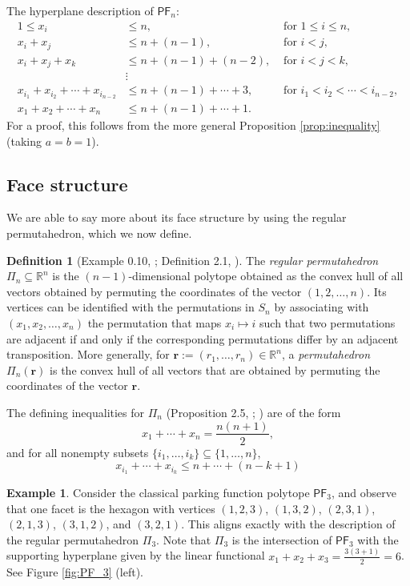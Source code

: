 \documentclass[11pt]{amsart}
\theoremstyle{definition}
\newtheorem{definition}[theorem]{Definition}
\newtheorem{example}[theorem]{Example}
\newcommand{\0}{\emptyset}
\newcommand{\R}{\mathbb{R}}
\newcommand{\PF}{\mathsf{PF}}
\begin{document}
The hyperplane description of $\PF_n$: 
\begin{align*}
    1 \leq x_i &\leq n, &\text{ for } 1 \leq i \leq n,\\
    x_i+x_j &\leq n + (n-1), &\text{ for } i < j,\\
    x_i+x_j+x_k &\leq n + (n-1) + (n-2), &\text{ for } i < j < k,\\
    &\vdots\nonumber\\
    x_{i_1}+ x_{i_2}+ \cdots + x_{i_{n-2}} &\leq n + (n-1) + \cdots + 3, &\text{ for } i_1 < i_2 < \cdots < i_{n-2},\\
    x_{1}+ x_{2}+ \cdots + x_{n} &\leq n + (n-1) + \cdots + 1.
\end{align*}
For a proof, this follows from the more general Proposition \ref{prop:inequality} (taking $a=b=1$).


\subsection{Face structure}
We are able to say more about its face structure by using the regular permutahedron, which we now define.

\begin{definition}[Example 0.10, \cite{Ziegler}; Definition 2.1, \cite{Pos}]\label{def:permutahedron}
The \textit{regular permutahedron} $\Pi_{n} \subseteq \R^n$ is the $(n-1)$-dimensional polytope obtained as the convex hull of all vectors obtained by permuting the coordinates of the vector $(1,2,\ldots,n)$. 
Its vertices can be identified with the permutations in $S_n$ by associating with $(x_1, x_2, \ldots, x_n)$ the permutation that maps $x_i \mapsto i$ such that two permutations are adjacent if and only if the corresponding permutations differ by an adjacent transposition.
More generally, for $\mathbf{r}:=(r_1, \ldots, r_n) \in \R^n$, a \textit{permutahedron} $\Pi_n(\mathbf{r})$ is the convex hull of all vectors that are obtained by permuting the coordinates of the vector $\mathbf{r}$.

The defining inequalities for $\Pi_n$ (Proposition 2.5, \cite{Pos}; \cite{Rad}) are of the form \[x_1 +\cdots +x_n = \frac{n(n+1)}{2},\] and for all nonempty subsets $\{i_1, \ldots, i_k\} \subseteq \{1, \ldots, n\}$, \[x_{i_1} + \cdots +x_{i_k} \leq n + \cdots + (n-k+1)%
\] 
\end{definition}

\begin{example}
Consider the classical parking function polytope $\PF_3$, and observe that one facet is the hexagon with vertices $(1,2,3)$, $(1,3,2)$, $(2,3,1)$, $(2,1,3)$, $(3,1,2)$, and $(3,2,1)$.
This aligns exactly with the description of the regular permutahedron $\Pi_3$.
Note that $\Pi_3$ is the intersection of $\PF_3$ with the supporting hyperplane given by the linear functional $x_1+x_2+x_3 = \frac{3(3+1)}{2}=6$. See Figure \ref{fig:PF_3} (left).
\end{example}
\end{document}
